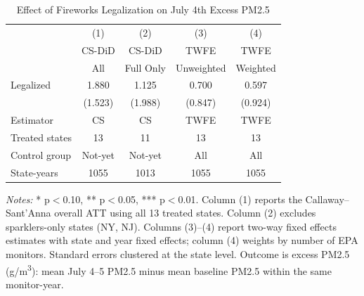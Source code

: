 \begin{table}[H]
\centering
\caption{Effect of Fireworks Legalization on July 4th Excess PM2.5}
\begin{threeparttable}
\begin{tabular}{lcccc}
\toprule
& (1) & (2) & (3) & (4) \\
& CS-DiD & CS-DiD & TWFE & TWFE \\
& All & Full Only & Unweighted & Weighted \\
\midrule
Legalized & 1.880 & 1.125 & 0.700 & 0.597 \\
& (1.523) & (1.988) & (0.847) & (0.924) \\
\addlinespace
Estimator & CS & CS & TWFE & TWFE \\
Treated states & 13 & 11 & 13 & 13 \\
Control group & Not-yet & Not-yet & All & All \\
State-years & 1055 & 1013 & 1055 & 1055 \\
\bottomrule
\end{tabular}
\begin{tablenotes}[flushleft]
\small
\item \textit{Notes:} * p$<$0.10, ** p$<$0.05, *** p$<$0.01. Column (1) reports the Callaway--Sant'Anna overall ATT using all 13 treated states. Column (2) excludes sparklers-only states (NY, NJ). Columns (3)--(4) report two-way fixed effects estimates with state and year fixed effects; column (4) weights by number of EPA monitors. Standard errors clustered at the state level. Outcome is excess PM2.5 (\textmu g/m\textsuperscript{3}): mean July 4--5 PM2.5 minus mean baseline PM2.5 within the same monitor-year.
\end{tablenotes}
\end{threeparttable}
\label{tab:main}
\end{table}
